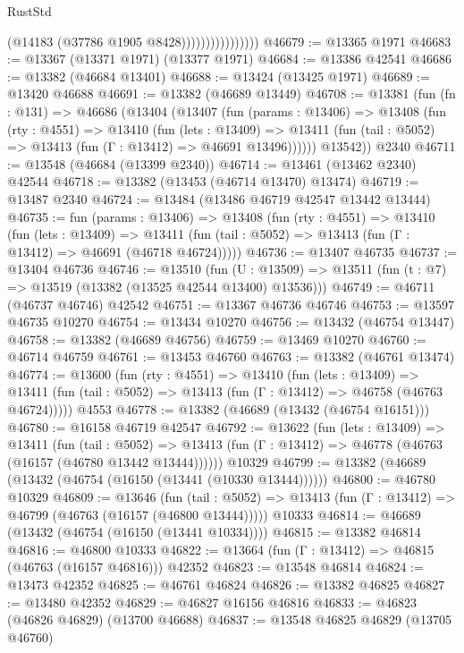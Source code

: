 \begin{lexlean}{RustStd}
\begin{coremodule}
                                (@14183 (@37786 @1905 @8428))))))))))))))))
@46679 := @13365 @1971
@46683 := @13367 (@13371 @1971) (@13377 @1971)
@46684 := @13386 @42541
@46686 := @13382 (@46684 @13401)
@46688 := @13424 (@13425 @1971)
@46689 := @13420 @46688
@46691 := @13382 (@46689 @13449)
@46708 := @13381
    (fun (fn : @131) =>
    @46686
      (@13404
        (@13407
          (fun (params : @13406) =>
          @13408
            (fun (rty : @4551) =>
            @13410
              (fun (lets : @13409) =>
              @13411 (fun (tail : @5052) => @13413 (fun (Γ : @13412) => @46691 @13496))))))
        @13542))
    @2340
@46711 := @13548 (@46684 (@13399 @2340))
@46714 := @13461 (@13462 @2340) @42544
@46718 := @13382 (@13453 (@46714 @13470) @13474)
@46719 := @13487 @2340
@46724 := @13484 (@13486 @46719 @42547 @13442 @13444)
@46735 := fun (params : @13406) =>
  @13408
    (fun (rty : @4551) =>
    @13410
      (fun (lets : @13409) =>
      @13411 (fun (tail : @5052) => @13413 (fun (Γ : @13412) => @46691 (@46718 @46724)))))
@46736 := @13407 @46735
@46737 := @13404 @46736
@46746 := @13510
    (fun (U : @13509) => @13511 (fun (t : @7) => @13519 (@13382 (@13525 @42544 @13400) @13536)))
@46749 := @46711 (@46737 @46746) @42542
@46751 := @13367 @46736 @46746
@46753 := @13597 @46735 @10270
@46754 := @13434 @10270
@46756 := @13432 (@46754 @13447)
@46758 := @13382 (@46689 @46756)
@46759 := @13469 @10270
@46760 := @46714 @46759
@46761 := @13453 @46760
@46763 := @13382 (@46761 @13474)
@46774 := @13600
    (fun (rty : @4551) =>
    @13410
      (fun (lets : @13409) =>
      @13411 (fun (tail : @5052) => @13413 (fun (Γ : @13412) => @46758 (@46763 @46724)))))
    @4553
@46778 := @13382 (@46689 (@13432 (@46754 @16151)))
@46780 := @16158 @46719 @42547
@46792 := @13622
    (fun (lets : @13409) =>
    @13411
      (fun (tail : @5052) =>
      @13413 (fun (Γ : @13412) => @46778 (@46763 (@16157 (@46780 @13442 @13444))))))
    @10329
@46799 := @13382 (@46689 (@13432 (@46754 (@16150 (@13441 (@10330 @13444))))))
@46800 := @46780 @10329
@46809 := @13646
    (fun (tail : @5052) => @13413 (fun (Γ : @13412) => @46799 (@46763 (@16157 (@46800 @13444)))))
    @10333
@46814 := @46689 (@13432 (@46754 (@16150 (@13441 @10334))))
@46815 := @13382 @46814
@46816 := @46800 @10333
@46822 := @13664 (fun (Γ : @13412) => @46815 (@46763 (@16157 @46816))) @42352
@46823 := @13548 @46814
@46824 := @13473 @42352
@46825 := @46761 @46824
@46826 := @13382 @46825
@46827 := @13480 @42352
@46829 := @46827 @16156 @46816
@46833 := @46823 (@46826 @46829) (@13700 @46688)
@46837 := @13548 @46825 @46829 (@13705 @46760)

\end{coremodule}
\end{lexlean}
